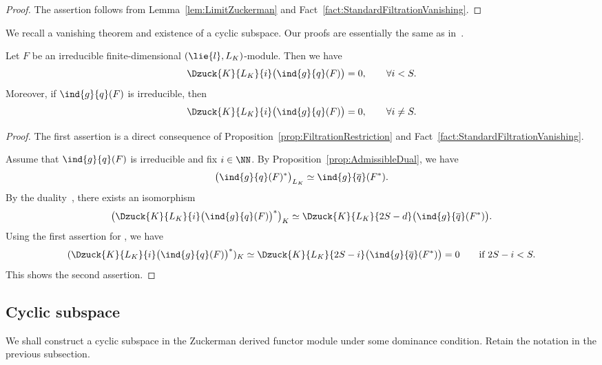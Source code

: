 \begin{proof}
	The assertion follows from Lemma~\ref{lem:LimitZuckerman} and Fact~\ref{fact:StandardFiltrationVanishing}.
\end{proof}

We recall a vanishing theorem and existence of a cyclic subspace.
Our proofs are essentially the same as in~\cite[Section~6]{Wa88_real_reductive_I}.

\begin{Proposition}\label{prop:Vanishing}
	Let $F$ be an irreducible finite-dimensional $(\lie{l}, L_K)$-module.
	Then we have
	\begin{align*}
		\Dzuck{K}{L_K}{i}\bigl(\ind{g}{q}(F)\bigr) = 0, \qquad \forall i < S.
	\end{align*}
	Moreover, if $\ind{g}{q}(F)$ is irreducible, then
	\begin{align*}
		\Dzuck{K}{L_K}{i}\bigl(\ind{g}{q}(F)\bigr) = 0, \qquad \forall i \neq S.
	\end{align*}
\end{Proposition}
	
\begin{proof}
	The first assertion is a direct consequence of Proposition~\ref{prop:FiltrationRestriction} and
	Fact~\ref{fact:StandardFiltrationVanishing}.
	
	Assume that $\ind{g}{q}(F)$ is irreducible and fix $i \in \NN$.
	By Proposition~\ref{prop:AdmissibleDual}, we have
 \[
 \bigl(\ind{g}{q}(F)^*\bigr)_{L_K} \simeq \ind{g}{\overline{q}}(F^*).
 \]
	By the duality~\cite[Corollary~3.7]{KnVo95_cohomological_induction}, there exists an isomorphism
 \[
 \bigl(\Dzuck{K}{L_K}{i}\bigl(\ind{g}{q}(F)\bigr)^*\bigr)_K\simeq \Dzuck{K}{L_K}{2S-d}\bigl(\ind{g}{\overline{q}}(F^*)\bigr).
 \]
	Using the first assertion for ,
	we have
	\begin{align*}
		(\Dzuck{K}{L_K}{i}\bigl(\ind{g}{q}(F)\bigr)^*)_K\simeq \Dzuck{K}{L_K}{2S-i}\bigl(\ind{g}{\overline{q}}(F^*)\bigr)=0\qquad \text{if}\ 2S-i < S.
	\end{align*}
	This shows the second assertion.
\end{proof}

\subsection{Cyclic subspace}

We shall construct a cyclic subspace in the Zuckerman derived functor module
under some dominance condition.
Retain the notation in the previous subsection.

